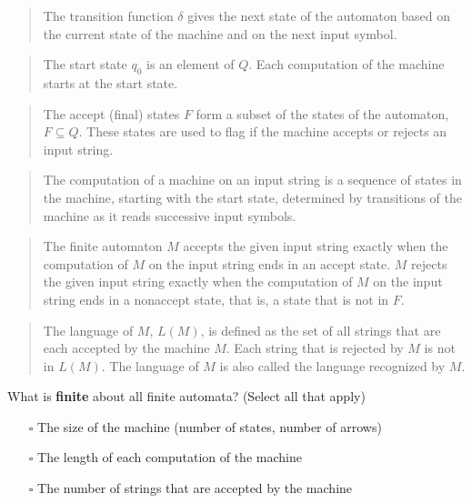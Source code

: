 \documentclass[12pt, oneside]{article}
\begin{document}
\begin{quote}
The transition function $\delta$ gives the next state of the automaton based on the current state of 
the machine and on the next input symbol.
\end{quote}

\begin{quote}
The start state $q_0$ is an element of $Q$.  Each computation of the machine starts at the  start  state.
\end{quote}

\begin{quote}
The accept (final) states $F$ form a subset of the states of the automaton, $F \subseteq  Q$. 
These states are used to flag if the machine accepts or rejects an input string.
\end{quote}


\begin{quote}
The computation of a machine on an input string is a sequence of states
in the machine,  starting with the start state, determined by transitions 
of the machine as it reads successive input symbols.
\end{quote}

\begin{quote}
The finite automaton $M$ accepts the given input string exactly when the computation of $M$ on the input string
ends in an accept state. $M$ rejects the given input string exactly when the computation of 
$M$ on the input string ends in a nonaccept state, that is, a state that is not in $F$.
\end{quote}

\begin{quote} 
The language of $M$, $L(M)$, is defined as the set of  all strings that are each accepted 
by the machine $M$. Each string that is rejected by $M$ is not in $L(M)$.
The language of $M$ is also called the language recognized by $M$.
\end{quote}   
   
What is {\bf finite} about all finite automata? (Select all that apply)
\begin{itemize}
   \item[$\square$] The size of the machine (number of states, number of arrows)
   \item[$\square$] The length of each computation of the machine
   \item[$\square$] The number of strings that are accepted by the machine
\end{itemize}
\newpage
  
\end{document}
